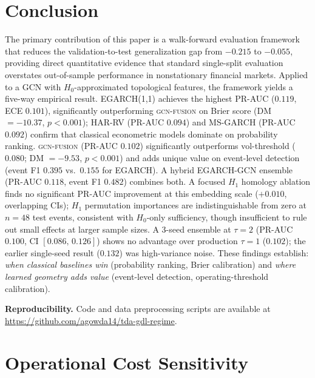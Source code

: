\documentclass[sigconf]{acmart}
\begin{document}
\section{Conclusion}

The primary contribution of this paper is a walk-forward evaluation framework
that reduces the validation-to-test generalization gap from $-0.215$ to
$-0.055$, providing direct quantitative evidence that standard single-split
evaluation overstates out-of-sample performance in nonstationary financial
markets. Applied to a GCN with $H_0$-approximated topological features, the
framework yields a five-way empirical result.
EGARCH(1,1) achieves the highest PR-AUC ($0.119$, ECE $0.101$), significantly
outperforming \textsc{gcn-fusion} on Brier score (DM $= {-}10.37$, $p{<}0.001$);
HAR-RV (PR-AUC $0.094$) and MS-GARCH (PR-AUC $0.092$) confirm that classical
econometric models dominate on probability ranking.
\textsc{gcn-fusion} (PR-AUC $0.102$) significantly outperforms vol-threshold
($0.080$; DM $= {-}9.53$, $p{<}0.001$) and adds unique value on event-level
detection (event F1 $0.395$ vs.\ $0.155$ for EGARCH).
A hybrid EGARCH-GCN ensemble (PR-AUC $0.118$, event F1 $0.482$) combines both.
A focused $H_1$ homology ablation finds no significant PR-AUC improvement
at this embedding scale ($+0.010$, overlapping CIs); $H_1$ permutation
importances are indistinguishable from zero at $n{=}48$ test events,
consistent with $H_0$-only sufficiency, though insufficient to rule out
small effects at larger sample sizes.
A 3-seed ensemble at $\tau{=}2$ (PR-AUC $0.100$, CI $[0.086,\, 0.126]$)
shows no advantage over production $\tau{=}1$ ($0.102$); the earlier
single-seed result ($0.132$) was high-variance noise.
These findings establish: \emph{when classical baselines win}
(probability ranking, Brier calibration) and \emph{where learned geometry
adds value} (event-level detection, operating-threshold calibration).

\smallskip\noindent\textbf{Reproducibility.} Code and data preprocessing
scripts are available at \url{https://github.com/agowda14/tda-gdl-regime}.

\appendix

\section{Operational Cost Sensitivity}
\label{sec:appendix_operational}
\end{document}
